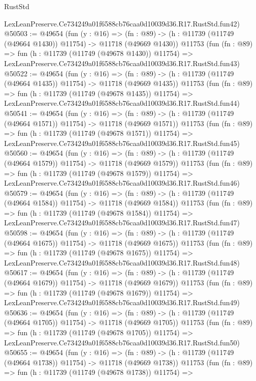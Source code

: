\begin{lexlean}{RustStd}
\begin{coremodule}
    LexLeanPreserve.Ce734249a01f6588cb76caa0d10039d36.R17.RustStd.fun42)
@50503 := @49654
    (fun (y : @16) =>
    (fn : @89) -> (h : @11739 (@11749 (@49664 @1430)) @11754) -> @11718 (@49669 @1430))
    @11753
    (fun (fn : @89) =>
    fun (h : @11739 (@11749 (@49678 @1430)) @11754) =>
    LexLeanPreserve.Ce734249a01f6588cb76caa0d10039d36.R17.RustStd.fun43)
@50522 := @49654
    (fun (y : @16) =>
    (fn : @89) -> (h : @11739 (@11749 (@49664 @1435)) @11754) -> @11718 (@49669 @1435))
    @11753
    (fun (fn : @89) =>
    fun (h : @11739 (@11749 (@49678 @1435)) @11754) =>
    LexLeanPreserve.Ce734249a01f6588cb76caa0d10039d36.R17.RustStd.fun44)
@50541 := @49654
    (fun (y : @16) =>
    (fn : @89) -> (h : @11739 (@11749 (@49664 @1571)) @11754) -> @11718 (@49669 @1571))
    @11753
    (fun (fn : @89) =>
    fun (h : @11739 (@11749 (@49678 @1571)) @11754) =>
    LexLeanPreserve.Ce734249a01f6588cb76caa0d10039d36.R17.RustStd.fun45)
@50560 := @49654
    (fun (y : @16) =>
    (fn : @89) -> (h : @11739 (@11749 (@49664 @1579)) @11754) -> @11718 (@49669 @1579))
    @11753
    (fun (fn : @89) =>
    fun (h : @11739 (@11749 (@49678 @1579)) @11754) =>
    LexLeanPreserve.Ce734249a01f6588cb76caa0d10039d36.R17.RustStd.fun46)
@50579 := @49654
    (fun (y : @16) =>
    (fn : @89) -> (h : @11739 (@11749 (@49664 @1584)) @11754) -> @11718 (@49669 @1584))
    @11753
    (fun (fn : @89) =>
    fun (h : @11739 (@11749 (@49678 @1584)) @11754) =>
    LexLeanPreserve.Ce734249a01f6588cb76caa0d10039d36.R17.RustStd.fun47)
@50598 := @49654
    (fun (y : @16) =>
    (fn : @89) -> (h : @11739 (@11749 (@49664 @1675)) @11754) -> @11718 (@49669 @1675))
    @11753
    (fun (fn : @89) =>
    fun (h : @11739 (@11749 (@49678 @1675)) @11754) =>
    LexLeanPreserve.Ce734249a01f6588cb76caa0d10039d36.R17.RustStd.fun48)
@50617 := @49654
    (fun (y : @16) =>
    (fn : @89) -> (h : @11739 (@11749 (@49664 @1679)) @11754) -> @11718 (@49669 @1679))
    @11753
    (fun (fn : @89) =>
    fun (h : @11739 (@11749 (@49678 @1679)) @11754) =>
    LexLeanPreserve.Ce734249a01f6588cb76caa0d10039d36.R17.RustStd.fun49)
@50636 := @49654
    (fun (y : @16) =>
    (fn : @89) -> (h : @11739 (@11749 (@49664 @1705)) @11754) -> @11718 (@49669 @1705))
    @11753
    (fun (fn : @89) =>
    fun (h : @11739 (@11749 (@49678 @1705)) @11754) =>
    LexLeanPreserve.Ce734249a01f6588cb76caa0d10039d36.R17.RustStd.fun50)
@50655 := @49654
    (fun (y : @16) =>
    (fn : @89) -> (h : @11739 (@11749 (@49664 @1738)) @11754) -> @11718 (@49669 @1738))
    @11753
    (fun (fn : @89) =>
    fun (h : @11739 (@11749 (@49678 @1738)) @11754) =>

\end{coremodule}
\end{lexlean}
